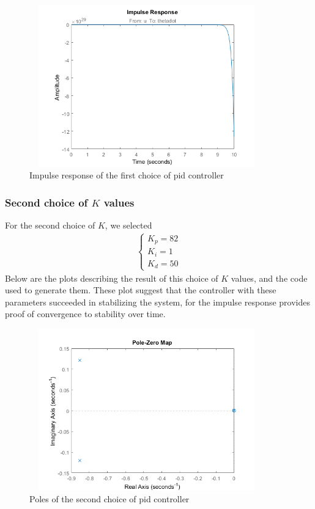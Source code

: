 \documentclass [12pt,letterpaper]{exam}
\begin{document}
\begin{figure}[H]
  \centering
    \includegraphics[width=10.15cm, height=7cm]{pid_impulse} 
  \caption{Impulse response of the first choice of pid controller}
  \label{fig:pid_impulse}
\end{figure}



\subsubsection{Second choice of $K$ values}
For the second choice of $K$, we selected
\begin{align}
\begin{cases}
K_p = 82 \\
K_i = 1 \\
K_d = 50
\end{cases}
\end{align}
Below are the plots describing the result of this choice of $K$ values, and the code used to generate them. These plot suggest that the controller with these parameters succeeded in stabilizing the system, for the impulse response provides proof of convergence to stability over time.

\begin{figure}[H]
  \centering
    \includegraphics[width=10.15cm, height=7cm]{pid2_poles} 
  \caption{Poles of the second choice of pid controller}
  \label{fig:pid2_poles}
\end{figure}
\end{document}
